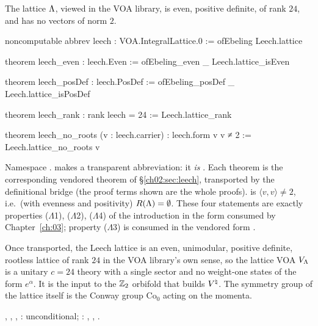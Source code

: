 \begin{theorem}\label{ch02:thm:leechVOAlattice}
The lattice ${\Lambda}$, viewed in the VOA library, is even, positive definite, of rank $24$, and has
no vectors of norm $2$.
\end{theorem}
\begin{leancode}
noncomputable abbrev leech : VOA.IntegralLattice.{0} := ofEbeling Leech.lattice

theorem leech_even : leech.Even := ofEbeling_even _ Leech.lattice_isEven

theorem leech_posDef : leech.PosDef := ofEbeling_posDef _ Leech.lattice_isPosDef

theorem leech_rank : rank leech = 24 := Leech.lattice_rank

theorem leech_no_roots (v : leech.carrier) : leech.form v v ≠ 2 := Leech.lattice_no_roots v
\end{leancode}
\begin{dictionary}
Namespace .   makes  a transparent abbreviation: it
\emph{is} .  Each theorem is the corresponding vendored theorem of
\S\ref{ch02:sec:leech}, transported by the definitional bridge (the proof terms shown are the
whole proofs).   is $\langle v,v\rangle\ne2$, i.e.\ (with evenness and
positivity) $R({\Lambda})=\emptyset$.  These four statements are exactly properties
(\(\Lambda\)1), (\(\Lambda\)2), (\(\Lambda\)4) of the introduction in the form consumed by
Chapter~\ref{ch:03}; property (\(\Lambda\)3) is consumed in the vendored form
.
\end{dictionary}
\begin{physics}
Once transported, the Leech lattice is an even, unimodular, positive definite, rootless lattice of rank $24$ in the VOA library's own sense, so the lattice VOA $V_{\Lambda}$ is a unitary $c=24$ theory with a single sector and no weight-one states of the form $e^\alpha$. It is the input to the ${\mathbb{Z}}_2$ orbifold that builds ${V^{\natural}}$. The symmetry group of the lattice itself is the Conway group $\mathrm{Co}_0$ acting on the momenta.
\end{physics}
\begin{status}
, , , :
unconditional; : , , .
\end{status}

